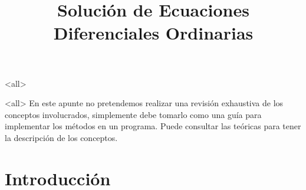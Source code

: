 \mode<all>









\title{
   Solución de Ecuaciones Diferenciales Ordinarias }
\subject{ Métodos de Euler y de Runge-Kutta}





\mode<all>
En este apunte no pretendemos realizar una revisión exhaustiva de los conceptos involucrados, 
simplemente debe tomarlo como una guía para implementar los métodos en un programa. Puede consultar
las teóricas para tener la descripción de los conceptos.

\section{Introducción}


